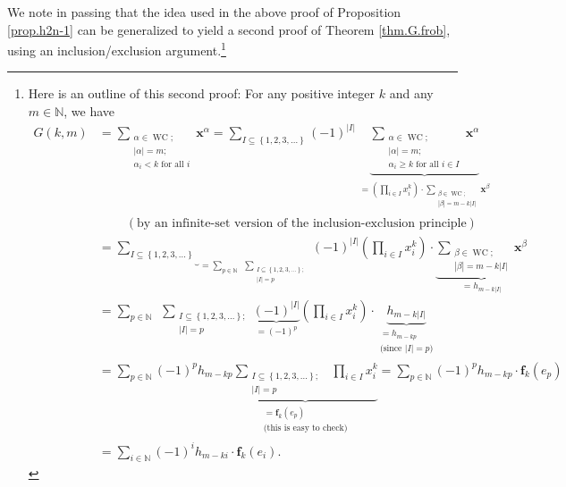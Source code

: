 \documentclass[numbers=enddot,12pt,final,onecolumn,notitlepage]{scrartcl}%
\theoremstyle{definition}
\let\sumnonlimits\sum
\let\prodnonlimits\prod
\renewcommand{\sum}{\sumnonlimits\limits}
\renewcommand{\prod}{\prodnonlimits\limits}
\begin{document}
We note in passing that the idea used in the above proof of Proposition
\ref{prop.h2n-1} can be generalized to yield a second proof of Theorem
\ref{thm.G.frob}, using an inclusion/exclusion argument.\footnote{Here is an
outline of this second proof: For any positive integer $k$ and any
$m\in\mathbb{N}$, we have%
\begin{align*}
G\left(  k,m\right)   &  =\sum_{\substack{\alpha\in\operatorname*{WC}%
;\\\left\vert \alpha\right\vert =m;\\\alpha_{i}<k\text{ for all }i}%
}\mathbf{x}^{\alpha}=\sum_{I\subseteq\left\{  1,2,3,\ldots\right\}  }\left(
-1\right)  ^{\left\vert I\right\vert }\underbrace{\sum_{\substack{\alpha
\in\operatorname*{WC};\\\left\vert \alpha\right\vert =m;\\\alpha_{i}\geq
k\text{ for all }i\in I}}\mathbf{x}^{\alpha}}_{\substack{=\left(  \prod_{i\in
I}x_{i}^{k}\right)  \cdot\sum_{\substack{\beta\in\operatorname*{WC}%
;\\\left\vert \beta\right\vert =m-k\left\vert I\right\vert }}\mathbf{x}%
^{\beta}}}\\
&  \ \ \ \ \ \ \ \ \ \ \left(  \text{by an infinite-set version of the
inclusion-exclusion principle}\right) \\
&  =\underbrace{\sum_{I\subseteq\left\{  1,2,3,\ldots\right\}  }}_{=\sum
_{p\in\mathbb{N}}\ \ \sum_{\substack{I\subseteq\left\{  1,2,3,\ldots\right\}
;\\\left\vert I\right\vert =p}}}\left(  -1\right)  ^{\left\vert I\right\vert
}\left(  \prod_{i\in I}x_{i}^{k}\right)  \cdot\underbrace{\sum
_{\substack{\beta\in\operatorname*{WC};\\\left\vert \beta\right\vert
=m-k\left\vert I\right\vert }}\mathbf{x}^{\beta}}_{=h_{m-k\left\vert
I\right\vert }}\\
&  =\sum_{p\in\mathbb{N}}\ \ \sum_{\substack{I\subseteq\left\{  1,2,3,\ldots
\right\}  ;\\\left\vert I\right\vert =p}}\underbrace{\left(  -1\right)
^{\left\vert I\right\vert }}_{=\left(  -1\right)  ^{p}}\left(  \prod_{i\in
I}x_{i}^{k}\right)  \cdot\underbrace{h_{m-k\left\vert I\right\vert }%
}_{\substack{=h_{m-kp}\\\text{(since }\left\vert I\right\vert =p\text{)}}}\\
&  =\sum_{p\in\mathbb{N}}\left(  -1\right)  ^{p}h_{m-kp}\underbrace{\sum
_{\substack{I\subseteq\left\{  1,2,3,\ldots\right\}  ;\\\left\vert
I\right\vert =p}}\ \ \prod_{i\in I}x_{i}^{k}}_{\substack{=\mathbf{f}%
_{k}\left(  e_{p}\right)  \\\text{(this is easy to check)}}}=\sum
_{p\in\mathbb{N}}\left(  -1\right)  ^{p}h_{m-kp}\cdot\mathbf{f}_{k}\left(
e_{p}\right) \\
&  =\sum_{i\in\mathbb{N}}\left(  -1\right)  ^{i}h_{m-ki}\cdot\mathbf{f}%
_{k}\left(  e_{i}\right)  .
\end{align*}
}
\end{document}
